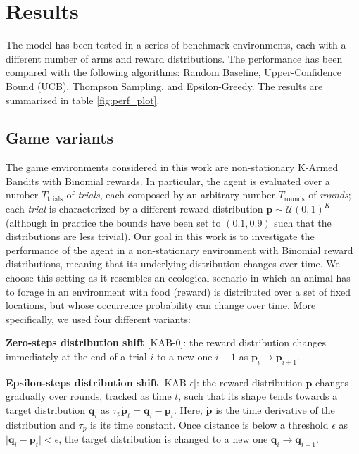 \section{Results}

The model has been tested in a series of benchmark environments, each with a different number of arms and reward distributions. The performance has been compared with the following algorithms: Random Baseline, Upper-Confidence Bound (UCB), Thompson Sampling, and Epsilon-Greedy. The results are
summarized in table \ref{fig:perf_plot}.

\subsection{Game variants}
\noindent The game environments considered in this work are non-stationary K-Armed Bandits with Binomial rewards.
In particular, the agent is evaluated over a number $T_{\text{trials}}$ of \textit{trials}, each composed by an arbitrary number $T_{\text{rounds}}$ of \textit{rounds}; each \textit{trial} is characterized by a different reward distribution $\mathbf{p}\sim\mathcal{U}(0,1)^{K}$ (although in practice the bounds have been set to $(0.1, 0.9)$ such that the distributions are less trivial).
Our goal in this work is to investigate the performance of the agent in a non-stationary environment with Binomial reward distributions, meaning that its underlying distribution changes over time.
We choose this setting as it resembles an ecological scenario in which an animal has to forage in an environment with food (reward) is distributed over a set of fixed locations, but whose occurrence probability can change over time.
More specifically, we used four different variants:

\noindent \textbf{Zero-steps distribution shift} [\textsc{KAB-0}]: the reward distribution changes immediately at the end of a trial $i$ to a new one $i+1$ as $\mathbf{\mathbf{p}}_{i} \to \mathbf{\mathbf{p}}_{i+1}$.

\noindent \textbf{Epsilon-steps distribution shift} [\textsc{KAB-$\epsilon$}]:
the reward distribution $\mathbf{p}$ changes gradually over rounds, tracked as time $t$, such that its shape tends towards a target distribution $\mathbf{q}_{i}$ as
$\tau_{p}\dot{\mathbf{p}}_{t}=\mathbf{q}_{i}-\mathbf{p}_{t}$. Here, $\dot{\mathbf{p}}$ is the time derivative of the distribution and $\tau_{p}$ is its time constant.
Once distance is below a threshold $\epsilon$ as $\vert \mathbf{q}_{i} - \mathbf{p}_{t}\vert < \epsilon$, the target distribution is changed to a new one $\mathbf{q}_{i}\to\mathbf{q}_{i+1}$.

